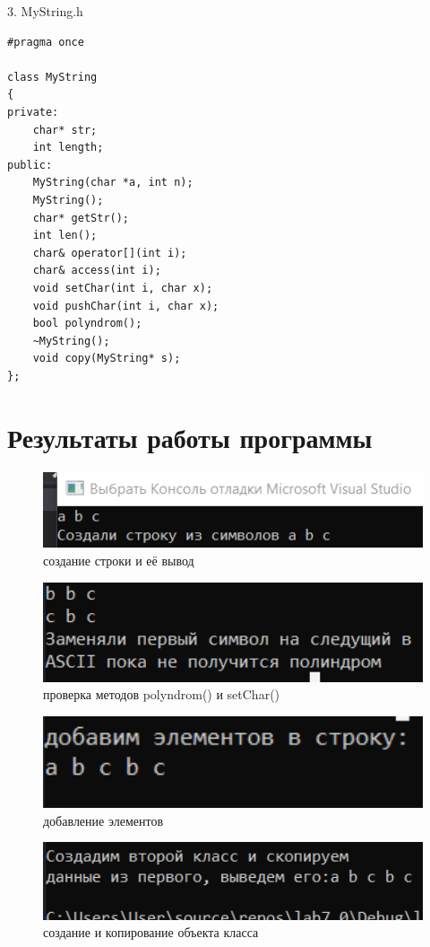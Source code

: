 ﻿\documentclass[a4paper, 12pt]{extarticle}
\begin{document}
3. MyString.h
\begin{verbatim}
#pragma once

class MyString
{
private:
	char* str;
	int length;
public:
	MyString(char *a, int n);
	MyString();
	char* getStr();
	int len();
	char& operator[](int i);
	char& access(int i);
	void setChar(int i, char x);
	void pushChar(int i, char x);
	bool polyndrom();
	~MyString();
	void copy(MyString* s);
};
\end{verbatim}

\section{Результаты работы программы}
\begin{figure}[H]
    \centering
    \includegraphics[width=400pt]{Test.png}
    \caption{создание строки и её вывод}
    \label{fig:my_label}
\end{figure}

\begin{figure}[H]
    \centering
    \includegraphics[width=400pt]{Test1.png}
    \caption{проверка методов polyndrom() и setChar()}
    \label{fig:my_label}
\end{figure}

\begin{figure}[H]
    \centering
    \includegraphics[width=400pt]{Test2.png}
    \caption{добавление элементов}
    \label{fig:my_label}
\end{figure}

\begin{figure}[H]
    \centering
    \includegraphics[width=400pt]{Test3.png}
    \caption{создание и копирование объекта класса}
    \label{fig:my_label}
\end{figure}
\end{document}
